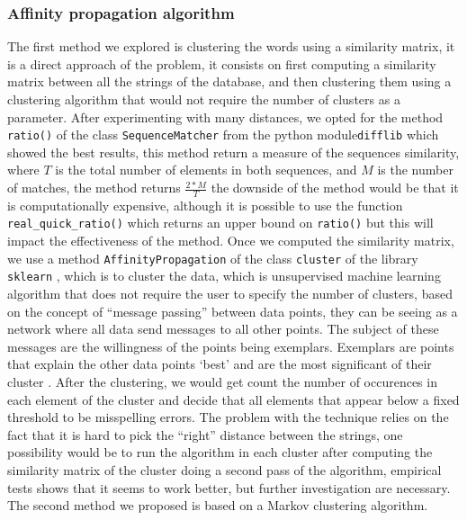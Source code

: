 \documentclass{article}
\begin{document}
\subsubsection{Affinity propagation algorithm}
The first method we explored is clustering the words using a similarity matrix, it is a direct approach of the problem, it consists on first computing a similarity matrix between all the strings of the database, and then clustering them using a clustering algorithm that would not require the number of clusters as a parameter. After experimenting with many distances, we opted for the method \texttt{ratio()} of the class \texttt{SequenceMatcher} from the python module\texttt{difflib} which showed the best results, this method return a measure of the sequences similarity, where $T$ is the total number of elements in both sequences, and $M$ is the number of matches, the method returns $\frac{2*M}{T}$ the downside of the method would be that it is computationally expensive, although it is possible to use the function \texttt{real\_quick\_ratio()} which returns an upper bound on \texttt{ratio()}
but this will impact the effectiveness of the method. Once we computed the similarity matrix, we use a method \texttt{AffinityPropagation} of the class \texttt{cluster} of the library \texttt{sklearn} \cite{sklearn}, which is to cluster the data, which is unsupervised machine learning algorithm that does not require the user to specify the number of clusters, based on the concept of ``message passing'' between data points, they can be seeing as a network where all data send messages to all other points. The subject of these messages are the willingness of the points being exemplars. Exemplars are points that explain the other data points ‘best’ and are the most significant of their cluster \cite{richi}. After the clustering, we would get count the number of occurences in each element of the cluster and decide that all elements that appear below a fixed threshold to be misspelling errors. The problem with the technique relies on the fact that it is hard to pick the ``right'' distance between the strings, one possibility would be to run the algorithm in each cluster after computing the similarity matrix of the cluster doing a second pass of the algorithm, empirical tests shows that it seems to work better, but further investigation are necessary.
The second method we proposed is based on a Markov clustering algorithm.
\end{document}
